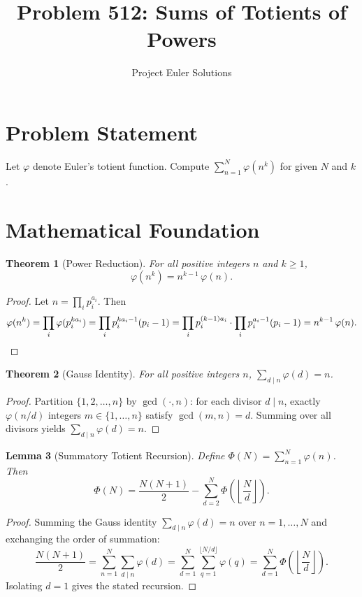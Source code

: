 \documentclass[11pt]{article}
\title{Problem 512: Sums of Totients of Powers}
\author{Project Euler Solutions}
\date{}
\newtheorem{theorem}{Theorem}
\newtheorem{lemma}[theorem]{Lemma}
\begin{document}
\maketitle

\section{Problem Statement}

Let $\varphi$ denote Euler's totient function. Compute $\sum_{n=1}^{N}\varphi(n^k)$ for given $N$ and $k$.

\section{Mathematical Foundation}

\begin{theorem}[Power Reduction]
For all positive integers $n$ and $k \geq 1$,
\[
\varphi(n^k) = n^{k-1}\,\varphi(n).
\]
\end{theorem}

\begin{proof}
Let $n = \prod_i p_i^{a_i}$. Then
\[
\varphi(n^k) = \prod_i \varphi(p_i^{ka_i}) = \prod_i p_i^{ka_i - 1}(p_i - 1) = \prod_i p_i^{(k-1)a_i} \cdot \prod_i p_i^{a_i-1}(p_i - 1) = n^{k-1}\,\varphi(n). \qedhere
\]
\end{proof}

\begin{theorem}[Gauss Identity]
For all positive integers $n$, $\sum_{d \mid n}\varphi(d) = n$.
\end{theorem}

\begin{proof}
Partition $\{1, 2, \ldots, n\}$ by $\gcd(\cdot, n)$: for each divisor $d \mid n$, exactly $\varphi(n/d)$ integers $m \in \{1,\ldots,n\}$ satisfy $\gcd(m,n) = d$. Summing over all divisors yields $\sum_{d \mid n}\varphi(d) = n$.
\end{proof}

\begin{lemma}[Summatory Totient Recursion]
Define $\Phi(N) = \sum_{n=1}^{N}\varphi(n)$. Then
\[
\Phi(N) = \frac{N(N+1)}{2} - \sum_{d=2}^{N}\Phi\!\left(\left\lfloor\frac{N}{d}\right\rfloor\right).
\]
\end{lemma}

\begin{proof}
Summing the Gauss identity $\sum_{d \mid n}\varphi(d) = n$ over $n = 1,\ldots,N$ and exchanging the order of summation:
\[
\frac{N(N+1)}{2} = \sum_{n=1}^{N}\sum_{d \mid n}\varphi(d) = \sum_{d=1}^{N}\sum_{q=1}^{\lfloor N/d\rfloor}\varphi(q) = \sum_{d=1}^{N}\Phi\!\left(\left\lfloor\frac{N}{d}\right\rfloor\right).
\]
Isolating $d = 1$ gives the stated recursion.
\end{proof}
\end{document}
